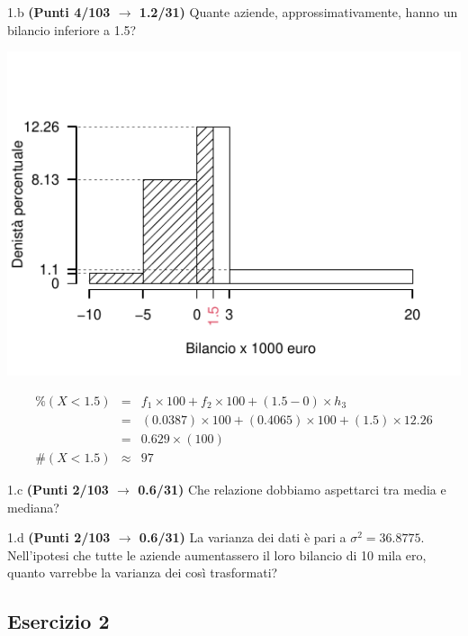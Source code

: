 \documentclass[
  11pt,
]{book}
\theoremstyle{mytheoremstyle}
\theoremstyle{mydefstyle}
\newenvironment{sol}
  {
  \begin{tcolorbox}[enhanced,breakable,arc=0.1mm,boxrule=1pt,colback=white,colframe=iblue,
  title=\bf \fontfamily{lmss}\selectfont \hspace{.5 cm} Soluzione,drop fuzzy shadow]

}{
\end{tcolorbox}
  }
\begin{document}
1.b \textbf{(Punti 4/103 \(\rightarrow\) 1.2/31)} Quante aziende, approssimativamente, hanno un bilancio inferiore a 1.5?

\begin{sol}

\begin{center}\includegraphics{Esami_passati_con_soluzioni_files/figure-latex/2021-34,-1} \end{center}

\begin{eqnarray*}
     \%(X< 1.5 ) &=&  f_{ 1 }\times 100+f_{ 2 }\times 100 +( 1.5 - 0 )\times h_{ 3 } \\
              &=&  ( 0.0387 )\times 100+( 0.4065 )\times 100 +( 1.5 )\times  12.26  \\
              &=&  0.629 \times(100) \\
     \#(X< 1.5 ) &\approx& 97 
         \end{eqnarray*}

\end{sol}

1.c \textbf{(Punti 2/103 \(\rightarrow\) 0.6/31)} Che relazione dobbiamo aspettarci tra media e mediana?

1.d \textbf{(Punti 2/103 \(\rightarrow\) 0.6/31)} La varianza dei dati è pari a \(\sigma^2=36.8775\). Nell'ipotesi che tutte le aziende aumentassero il loro bilancio di 10 mila ero, quanto varrebbe la varianza dei così trasformati?

\subsection{Esercizio 2}\label{esercizio-2-9}
\end{document}
